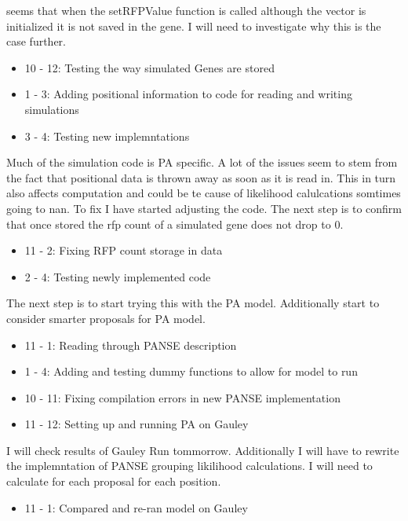 \documentclass[12pt,hyperref]{labbook}
\begin{document}
seems that when the setRFPValue function is called although the vector is initialized it is not saved in the gene. I will need to
investigate why this is the case further.
\begin{itemize}
 \item 10 - 12: Testing the way simulated Genes are stored
 \item 1 - 3: Adding positional information to code for reading and writing simulations
 \item 3 - 4: Testing new implemntations
\end{itemize}
Much of the simulation code is PA specific. A lot of the issues seem to stem from the fact that positional data is thrown
away as soon as it is read in. This in turn also affects computation and could be te cause of likelihood calulcations 
somtimes going to nan. To fix I have started adjusting the code. The next step is to confirm that once stored the rfp count of 
a simulated gene does not drop to 0.
\begin{itemize}
 \item 11 - 2: Fixing RFP count storage in data
 \item 2 - 4: Testing newly implemented code
\end{itemize}
The next step is to start trying this with the PA model. Additionally start to consider smarter
proposals for PA model.
\begin{itemize}
 \item 11 - 1: Reading through PANSE description
 \item 1 - 4: Adding and testing dummy functions to allow for model to run
\end{itemize}
\begin{itemize}
    \item 10 - 11: Fixing compilation errors in new PANSE implementation
    \item 11 - 12: Setting up and running PA on Gauley
\end{itemize}
I will check results of Gauley Run tommorrow. Additionally I will have to rewrite the implemntation of PANSE grouping likilihood
calculations. I will need to calculate for each proposal for each position.
\begin{itemize}
 \item 11 - 1: Compared and re-ran model on Gauley
\end{itemize}
\end{document}
